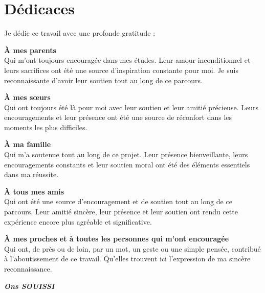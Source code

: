 \chapter*{Dédicaces}
{}

\noindent Je dédie ce travail avec une profonde gratitude :
\vspace{8mm}

\begin{center}
\textbf{À mes parents} \\
Qui m'ont toujours encouragée dans mes études. Leur amour inconditionnel et leurs sacrifices ont été une source d'inspiration constante pour moi. Je suis reconnaissante d'avoir leur soutien tout au long de ce parcours. \\
\vspace{5mm}

\textbf{À mes sœurs} \\ 
Qui ont toujours été là pour moi avec leur soutien et leur amitié précieuse. Leurs encouragements et leur présence ont été une source de réconfort dans les moments les plus difficiles. \\
\vspace{5mm}

\textbf{À ma famille} \\
Qui m'a soutenue tout au long de ce projet.  Leur présence bienveillante, leurs encouragements constants et leur soutien moral ont été des éléments essentiels dans ma réussite. \\
\vspace{5mm}

\textbf{À tous mes amis} \\
Qui ont été une source d'encouragement et de soutien tout au long de ce parcours. Leur amitié sincère, leur présence et leur soutien ont rendu cette expérience encore plus agréable et significative. \\
\vspace{5mm}

\textbf{À mes proches et à toutes les personnes qui m'ont encouragée} \\
Qui ont, de près ou de loin, par un mot, un geste ou une simple pensée, contribué à l'aboutissement de ce travail. Qu'elles trouvent ici l'expression de ma sincère reconnaissance. \\
\vspace{5mm}
 \end{center}


     \begin{flushright}
         \bf\it {\textbf{Ons SOUISSI}}
    \end{flushright}
